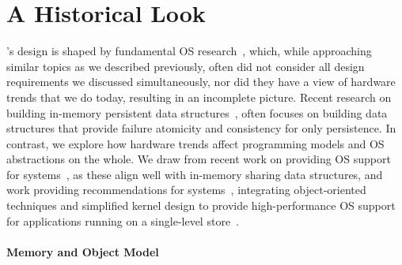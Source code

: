 \fi

\section{A Historical Look}
\label{sec:historical}






\Twizzler's design
is shaped by fundamental OS
research~\cite{corbato_introduction_1965,chase:tocs94,k42,engler:sosp95,Kaashoek,engler1995avm,engler1995exterminate},
which,
while approaching similar topics as we described
previously, often did not consider all design
requirements we discussed simultaneously, nor did they have a view of hardware trends that we do today, resulting in an incomplete picture.
Recent research on building in-memory persistent data structures~\cite{volos:asplos11,coburn:asplos11,condit:sosp09,debnath:vldb10,lu:tos16,hu:atc17},
often focuses on building data structures that
provide failure atomicity and consistency for only persistence.
In contrast, we explore how hardware trends affect programming models and OS abstractions on the whole.
We draw from recent work on providing OS support for \NVM systems~\cite{caulfield:micro10}, as these align well with
in-memory sharing data structures, and work
providing recommendations for \NVM systems~\cite{mehra:ipdps04}, integrating
object-oriented techniques and simplified kernel design
to provide high-performance OS support for applications running on a single-level
store~\cite{shapiro:sosp99,bailey:hotos11}.


\paragraph{Memory and Object Model}

